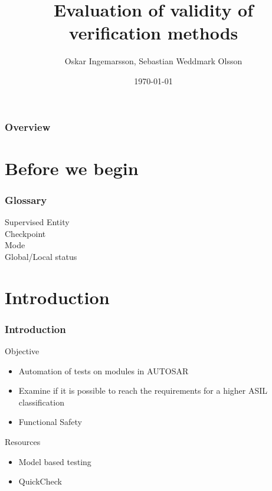\documentclass{beamer}
\title{Evaluation of validity of verification methods}
\author{Oskar Ingemarsson, Sebastian Weddmark Olsson}
\institute{Chalmers University of Technology, Mecel AB}
\date{\today}
\begin{document}
\begin{frame}
  \titlepage
\end{frame}

\begin{frame}
  \frametitle{Overview}
  \tableofcontents
\end{frame}

\section{Before we begin}

\begin{frame}
  \frametitle{Glossary}
  \begin{description}
    \item[Supervised Entity]
    \item[Checkpoint]
    \item[Mode]
    \item[Global/Local status]
  \end{description}
\end{frame}


\section{Introduction}

\begin{frame}[fragile]
  \frametitle{Introduction}
  \begin{block}{Objective}
    \begin{itemize}
        \item Automation of tests on modules in AUTOSAR
        \item Examine if it is possible to reach the requirements for
          a higher ASIL classification
        \item Functional Safety
    \end{itemize}
   \end{block}
  \begin{block}{Resources}
    \begin{itemize}
        \item Model based testing
        \item QuickCheck
    \end{itemize}
  \end{block}
\end{frame}
\end{document}
